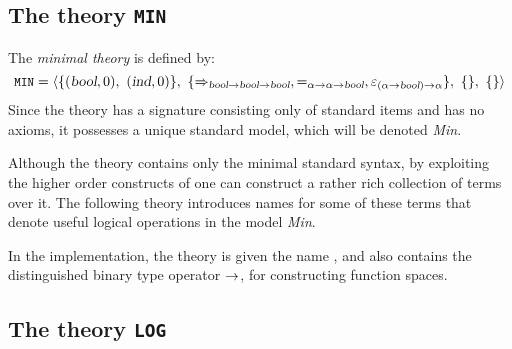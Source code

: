 \subsection{The theory {\tt MIN}}
\label{sec:min-thy}

The {\it minimal theory\/}  is defined by:
\[
\hbox{{\small\tt MIN}} =
\langle\{(\textsl{bool},0),\ (\textsl{ind},0)\},\
 \{\Rightarrow_{\textsl{bool}{\to}\textsl{bool}{\to}\textsl{bool}},
=_{\alpha{\to}\alpha{\to}\textsl{bool}},
\varepsilon_{(\alpha{\to}\textsl{bool}){\to}\alpha}\},\
\{\},\ \{\}\rangle
\]
Since the theory  has a signature consisting only of
standard items and has no axioms, it possesses a unique standard model,
which will be denoted {\em Min}.

Although the theory  contains only the minimal standard
syntax, by exploiting the higher order constructs of \HOL{} one can
construct a rather rich collection of terms over it. The following
theory introduces names for some of these terms that denote useful
logical operations in the model {\em Min}.

In the implementation, the theory  is given the name
, and also contains the distinguished binary type
operator ${\to}$, for constructing function spaces.

\subsection{The theory {\tt LOG}}
\label{LOG}

